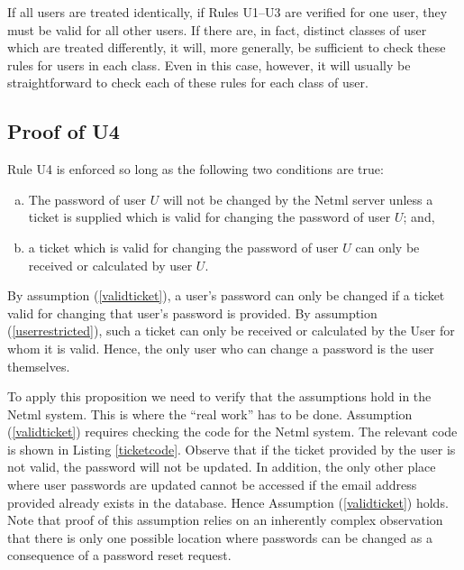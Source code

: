 If all users are treated identically, if Rules U1--U3 are verified for one user, they
must be valid for all other users. If there are, in fact, distinct classes of user which 
are treated differently, it will, more generally, be sufficient to check these rules for 
users in each class. Even in this case, however, it will usually be straightforward to check
each of these rules for each class of user.

\subsection{Proof of U4}
\begin{proposition}
Rule U4 is enforced so long as the following two conditions are true:
\begin{enumerate}[(a)]
\item\label{validticket} The password of  user $U$ will not be changed by the Netml server
unless a ticket is supplied which is valid for changing the password of
user $U$; and,

\item\label{userrestricted} a ticket which is valid for changing the password of user $U$
can only be received or calculated by user $U$.

\end{enumerate}
\end{proposition}

\begin{IEEEproof} 
By assumption (\ref{validticket}), a user's password can only be changed
if a ticket valid for changing that user's password is provided. By assumption (\ref{userrestricted}),
such a ticket can only be received or calculated by the User for whom it is valid. Hence, the only
user who can change a password is the user themselves.
\end{IEEEproof}

To apply this proposition we need to verify that the assumptions hold in the Netml system.
This is where the ``real work'' has to be done. Assumption (\ref{validticket}) requires
checking the code for the Netml system. The relevant code is shown in Listing \ref{ticketcode}.
Observe that if the ticket provided by the user is not valid, the password will not be updated.
In addition, the only other place where user passwords are updated cannot be accessed
if the email address provided already exists in the database. Hence Assumption (\ref{validticket})
holds. Note that proof of this assumption relies on an inherently complex observation that
there is only one possible location where passwords can be changed as a consequence of a 
password reset request.

